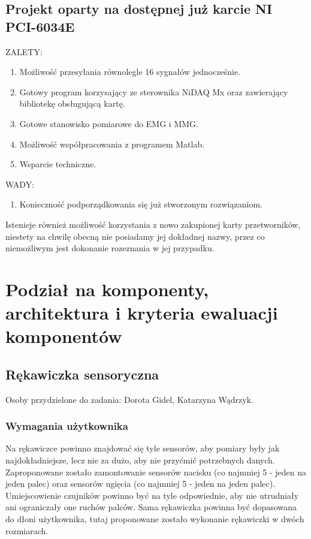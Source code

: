 \documentclass{article}
\begin{document}
\subsection{Projekt oparty na dostępnej już karcie NI PCI-6034E}
ZALETY:
\begin{enumerate}
    \item Możliwość przesyłania równolegle 16 sygnałów jednocześnie.
    \item Gotowy program korzysający ze sterownika NiDAQ Mx oraz zawierający bibliotekę obsługującą kartę.
\item Gotowe stanowisko pomiarowe do EMG i MMG.
\item Możliwość współpracowania z programem Matlab. 
\item Wsparcie techniczne.
\end{enumerate}
WADY:
\begin{enumerate}
    \item Konieczność podporządkowania się już stworzonym rozwiązaniom.
\end{enumerate}
Istenieje również możliwość korzystania z nowo zakupionej karty przetworników, niestety na chwilę obecną nie posiadamy jej dokładnej nazwy, przez co niemożliwym jest dokonanie rozeznania w jej przypadku.


\section{Podział na komponenty, architektura i kryteria ewaluacji komponentów}
\subsection{Rękawiczka sensoryczna}
Osoby przydzielone do zadania: Dorota Gidel, Katarzyna Wądrzyk.
\subsubsection{Wymagania użytkownika}
Na rękawiczce powinno znajdować się tyle sensorów, aby pomiary były jak najdokładniejsze, lecz nie za dużo, aby nie przyćmić potrzebnych danych. Zaproponowane zostało zamontowanie sensorów nacisku (co najmniej 5 - jeden na jeden palec) oraz sensorów ugięcia (co najmniej 5 - jeden na jeden palec). Umiejscowienie czujników powinno być na tyle odpowiednie, aby nie utrudniały ani ograniczały one ruchów palców. Sama rękawiczka powinna być dopasowana do dłoni użytkownika, tutaj proponowane zostało wykonanie rękawiczki w dwóch rozmiarach.
\end{document}
